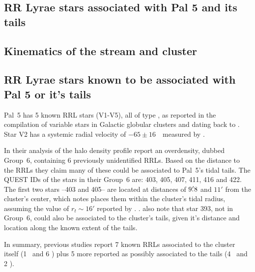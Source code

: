 \documentclass[twocolumn]{aastex63}
\begin{document}
\subsection{RR Lyrae stars associated with Pal 5 and its tails}



\subsection{Kinematics of the stream and cluster}





\subsection{RR Lyrae stars known to be associated with Pal 5 or it's tails}


Pal~5 has 5 known RRL stars (V1-V5), all of type \typec, as reported in the \citet{Clement2001} compilation of variable stars in Galactic globular clusters and dating back to \citet{SawyerHogg1973}. Star V2 has a  systemic radial velocity of  $-65\pm16$~\kms~measured by \citet{Vivas2005}.

In their analysis of the halo density profile \citet{Vivas2006} report an overdensity, dubbed Group~6, containing 6 previously unidentified RRLs. Based on the distance to the RRLs they claim many of these could be associated to Pal~5's tidal tails. The QUEST IDs of the stars in their Group~6 are: 403, 405, 407, 411, 416 and 422. The first two stars --403 and 405-- are located at distances of  $9\mbox{$.\mkern-4mu^\prime$}8$ and $11'$ from the cluster's center, which \citet{Vivas2004} notes places them within the cluster's tidal radius, assuming the value of $r_t\sim16'$ reported by \citet{Odenkirchen:2002}.  . \citet{Vivas2006} also note that star 393, not in Group~6, could also be associated to the cluster's tails, given it's distance and location along the known extent of the tails.

In summary,  previous studies report 7 known RRLs associated to the cluster itself (1 \typeab~and 6 \typec) plus 5 more reported as possibly associated to the tails (4 \typeab~and 2 \typec).
\end{document}
